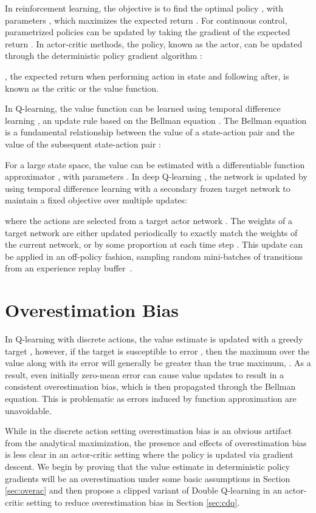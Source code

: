 \documentclass{article}
\begin{document}
In reinforcement learning, the objective is to find the optimal policy , with parameters , which maximizes the expected return . For continuous control, parametrized policies  can be updated by taking the gradient of the expected return . In actor-critic methods, the policy, known as the actor, can be updated through the deterministic policy gradient algorithm \cite{DPG}:

, the expected return when performing action  in state  and following  after, is known as the critic or the value function. 

In Q-learning, the value function can be learned using temporal difference learning \cite{sutton1988tdlearning,watkins1989qlearning}, an update rule based on the Bellman equation \cite{bellman}. The Bellman equation is a fundamental relationship between the value of a state-action pair  and the value of the subsequent state-action pair :


For a large state space, the value can be estimated with a differentiable function approximator , with parameters . In deep Q-learning \cite{DQN}, the network is updated by using temporal difference learning with a secondary frozen target network  to maintain a fixed objective  over multiple updates:

where the actions are selected from a target actor network . The weights of a target network are either updated periodically to exactly match the weights of the current network, or by some proportion  at each time step . This update can be applied in an off-policy fashion, sampling random mini-batches of transitions from an experience replay buffer~\cite{expreplay1992}.

\section{Overestimation Bias} \label{sec:over}


In Q-learning with discrete actions, the value estimate is updated with a greedy target , however, if the target is susceptible to error , then the maximum over the value along with its error will generally be greater than the true maximum,  \cite{thrun1993bias}. As a result, even initially zero-mean error can cause value updates to result in a consistent overestimation bias, which is then propagated through the Bellman equation. This is problematic as errors induced by function approximation are unavoidable. 

While in the discrete action setting overestimation bias is an obvious artifact from the analytical maximization, the presence and effects of overestimation bias is less clear in an actor-critic setting where the policy is updated via gradient descent. We begin by proving that the value estimate in deterministic policy gradients will be an overestimation under some basic assumptions in Section \ref{sec:overac} and then propose a clipped variant of Double Q-learning in an actor-critic setting to reduce overestimation bias in Section \ref{sec:cdq}. 
\end{document}
